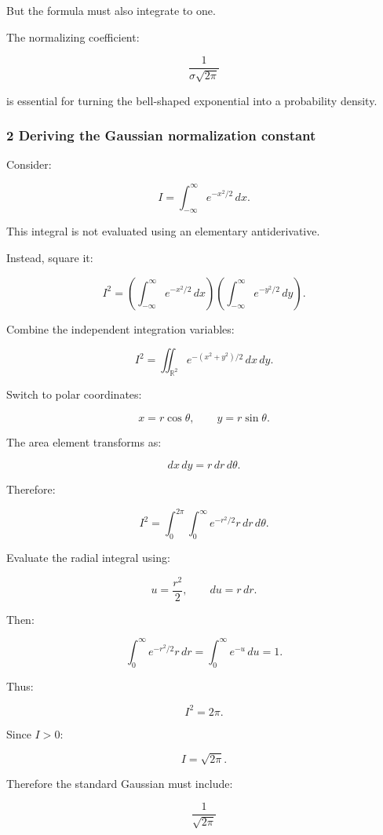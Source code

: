 But the formula must also integrate to one.

The normalizing coefficient:

\[
 \frac1{\sigma\sqrt{2\pi}}
\]

is essential for turning the bell-shaped exponential into a probability density.

\subsubsection{2 Deriving the Gaussian normalization constant}\label{02-foundations-ii-ch023-deriving-the-gaussian-normalization-constant}

\hypertarget{02-foundations-ii-ch023-deriving-the-gaussian-normalization-constant}{}

Consider:

\[
 I=\int_{-\infty}^{\infty}e^{-x^2/2}\,dx.
\]

This integral is not evaluated using an elementary antiderivative.

Instead, square it:

\[
 I^2= \left(\int_{-\infty}^{\infty}e^{-x^2/2}\,dx\right) \left(\int_{-\infty}^{\infty}e^{-y^2/2}\,dy\right).
\]

Combine the independent integration variables:

\[
 I^2= \iint_{\mathbb R^2} e^{-(x^2+y^2)/2}\,dx\,dy.
\]

Switch to polar coordinates:

\[
 x=r\cos\theta, \qquad y=r\sin\theta.
\]

The area element transforms as:

\[
 dx\,dy=r\,dr\,d\theta.
\]

Therefore:

\[
 I^2= \int_0^{2\pi}\int_0^\infty e^{-r^2/2}r\,dr\,d\theta.
\]

Evaluate the radial integral using:

\[
 u=\frac{r^2}{2}, \qquad du=r\,dr.
\]

Then:

\[
 \int_0^\infty e^{-r^2/2}r\,dr = \int_0^\infty e^{-u}\,du =1.
\]

Thus:

\[
 I^2=2\pi.
\]

Since \(I>0\):

\[
 \boxed{I=\sqrt{2\pi}}.
\]

Therefore the standard Gaussian must include:

\[
 \frac1{\sqrt{2\pi}}
\]

